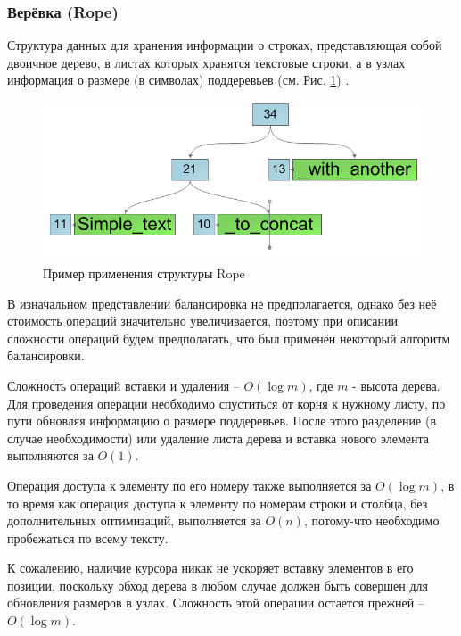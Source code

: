 \documentclass{fefu}
\begin{document}
			\subsubsection{Верёвка (Rope)}
				\par Структура данных для хранения информации о строках, представляющая собой
				двоичное дерево, в листах которых хранятся текстовые строки, а в узлах 
				информация о размере (в символах) поддеревьев (см. Рис. \ref{img:RopeExample})
				\cite{RopeArticle}.
				\begin{figure}[h]
					\centering
					\includegraphics[width=1\linewidth]{images/RopeExample.png}
					\caption{Пример применения структуры Rope}
					\label{img:RopeExample}
				\end{figure}
				\par В изначальном представлении балансировка не предполагается, однако без неё
				стоимость операций значительно увеличивается, поэтому при описании сложности
				операций будем предполагать, что был применён некоторый алгоритм балансировки.
				\par Сложность операций вставки и удаления -- $O(\log{m})$, где $m$ - высота
				дерева. Для проведения операции необходимо спуститься от корня к нужному листу,
				по пути обновляя информацию о размере поддеревьев. После этого разделение
				(в случае необходимости) или удаление листа дерева и вставка нового элемента
				выполняются за $O(1)$.
				\par Операция доступа к элементу по его номеру также выполняется за 
				$O(\log{m})$, в то время как операция доступа к элементу по номерам строки и
				столбца, без дополнительных оптимизаций, выполняется за $O(n)$, потому-что 
				необходимо пробежаться по всему тексту.
				\par К сожалению, наличие курсора никак не ускоряет вставку элементов в его
				позиции, поскольку обход дерева в любом случае должен быть совершен для
				обновления размеров в узлах. Сложность этой операции остается прежней -- 
				$O(\log{m})$.
\end{document}
